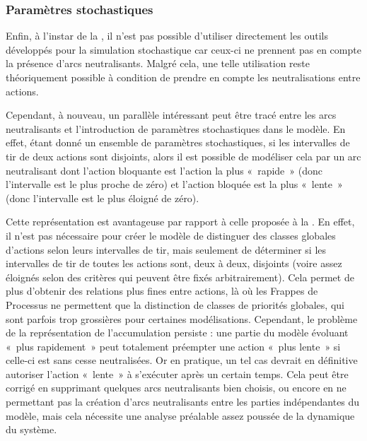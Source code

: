 \subsubsection{Paramètres stochastiques}

Enfin, à l'instar de la ,
il n'est pas possible d'utiliser directement les outils développés pour la simulation stochastique
car ceux-ci ne prennent pas en compte la présence d'arcs neutralisants.
Malgré cela, une telle utilisation reste théoriquement possible à condition de prendre
en compte les neutralisations entre actions.

Cependant, à nouveau, un parallèle intéressant peut être tracé entre les arcs neutralisants
et l'introduction de paramètres stochastiques dans le modèle.
En effet, étant donné un ensemble de paramètres stochastiques,
si les intervalles de tir de deux actions sont disjoints,
alors il est possible de modéliser cela par un arc neutralisant
dont l'action bloquante est l'action la plus «~rapide~»
(\cad donc l'intervalle est le plus proche de zéro)
et l'action bloquée est la plus «~lente~»
(\cad donc l'intervalle est le plus éloigné de zéro).

Cette représentation est avantageuse par rapport à celle proposée à la
.
En effet, il n'est pas nécessaire pour créer le modèle
de distinguer des classes globales d'actions selon leurs
intervalles de tir, mais seulement de déterminer si les intervalles de tir de toutes les actions
sont, deux à deux, disjoints (voire assez éloignés selon des critères qui peuvent être
fixés arbitrairement).
Cela permet de plus d'obtenir des relations plus fines entre actions,
là où les Frappes de Processus ne permettent que la distinction de classes de priorités
globales, qui sont parfois trop grossières pour certaines modélisations.
Cependant, le problème de la représentation de l'accumulation persiste :
une partie du modèle évoluant «~plus rapidement~» peut totalement préempter une
action «~plus lente~» si celle-ci est sans cesse neutralisées.
Or en pratique, un tel cas devrait en définitive autoriser l'action «~lente~» à s'exécuter
après un certain temps.
Cela peut être corrigé en supprimant quelques arcs neutralisants bien choisis,
ou encore en ne permettant pas la création d'arcs neutralisants entre les parties indépendantes
du modèle, mais cela nécessite une analyse préalable assez poussée de la dynamique
du système.
